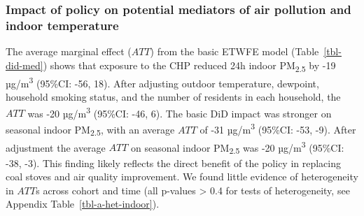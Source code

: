 \documentclass[
  letterpaper,
  DIV=11,
  numbers=noendperiod]{scrartcl}
\begin{document}
\subsubsection{Impact of policy on potential mediators of air pollution
and indoor
temperature}\label{impact-of-policy-on-potential-mediators-of-air-pollution-and-indoor-temperature}

The average marginal effect (\(ATT\)) from the basic ETWFE model
(Table~\ref{tbl-did-med}) shows that exposure to the CHP reduced 24h
indoor PM\textsubscript{2.5} by -19 µg/m\textsuperscript{3} (95\%CI:
-56, 18). After adjusting outdoor temperature, dewpoint, household
smoking status, and the number of residents in each household, the
\(ATT\) was -20 µg/m\textsuperscript{3} (95\%CI: -46, 6). The basic DiD
impact was stronger on seasonal indoor PM\textsubscript{2.5}, with an
average \(ATT\) of -31 µg/m\textsuperscript{3} (95\%CI: -53, -9). After
adjustment the average \(ATT\) on seasonal indoor PM\textsubscript{2.5}
was -20 µg/m\textsuperscript{3} (95\%CI: -38, -3). This finding likely
reflects the direct benefit of the policy in replacing coal stoves and
air quality improvement. We found little evidence of heterogeneity in
\(ATT\)s across cohort and time (all p-values \textgreater{} 0.4 for
tests of heterogeneity, see Appendix Table~\ref{tbl-a-het-indoor}).
\end{document}
